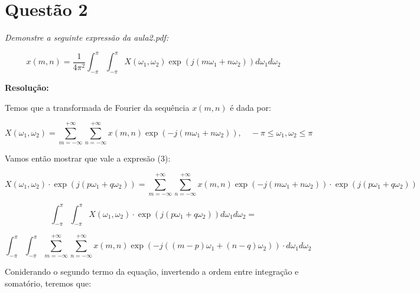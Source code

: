 \documentclass[]{abntex2}
\begin{document}
\section*{\textbf{Questão 2}}

\textit{Demonstre a seguinte expressão da aula2.pdf:}

\begin{equation}
	x(m, n) = \frac{1}{4\pi^2} \int_{-\pi}^{\pi} \int_{-\pi}^{\pi} X(\omega_1, \omega_2) \exp \left( j (m \omega_1 + n \omega_2) \right) d\omega_1 d\omega_2 \tag{3}
\end{equation}

\textbf{Resolução:}

Temos que a transformada de Fourier da sequência $x(m,n)$ é dada por:

\begin{center}
\begin{equation*}
	X(\omega_1, \omega_2) = \sum_{m=-\infty}^{+\infty} \sum_{n=-\infty}^{+\infty} x(m, n) \exp \left( -j (m \omega_1 + n \omega_2) \right), \quad -\pi \leq \omega_1, \omega_2 \leq \pi	
\end{equation*}
	
\end{center}

Vamos então mostrar que vale a expresão (3):

\begin{equation*}
	X(\omega_1, \omega_2) \cdot \exp \left( j (p \omega_1 + q \omega_2) \right)= \sum_{m=-\infty}^{+\infty} \sum_{n=-\infty}^{+\infty} x(m, n) \exp \left( -j (m \omega_1 + n \omega_2) \right) \cdot \exp \left( j (p \omega_1 + q \omega_2) \right)	
\end{equation*}

\begin{equation*}
	\int_{-\pi}^{\pi} \int_{-\pi}^{\pi}X(\omega_1, \omega_2) \cdot \exp \left( j (p \omega_1 + q \omega_2) \right)d\omega_1 d\omega_2= 
\end{equation*}

\begin{equation}
	\int_{-\pi}^{\pi} \int_{-\pi}^{\pi}\sum_{m=-\infty}^{+\infty} \sum_{n=-\infty}^{+\infty} x(m, n) \exp \left( -j ((m-p) \omega_1 + (n-q) \omega_2) \right) \cdot d\omega_1 d\omega_2 \tag{4}
\end{equation}

Coniderando o segundo termo da equação, invertendo a ordem entre integração e somatório, teremos que:
\end{document}
